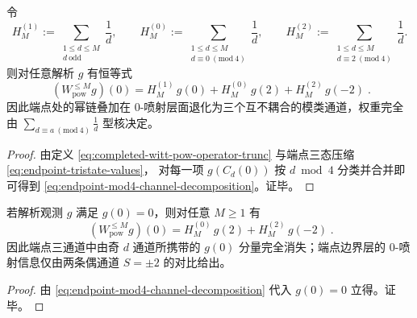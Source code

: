 \begin{proposition}[端点三通道分解：截断幂链在 \texorpdfstring{$S=0$}{S=0} 的模 \texorpdfstring{$4$}{4} 分组恒等式]\label{prop:endpoint-mod4-channel-decomposition}
令
\[
H_M^{(1)}:=\sum_{\substack{1\le d\le M\\ d\ \mathrm{odd}}}\frac1d,\qquad
H_M^{(0)}:=\sum_{\substack{1\le d\le M\\ d\equiv 0\ (\mathrm{mod}\ 4)}}\frac1d,\qquad
H_M^{(2)}:=\sum_{\substack{1\le d\le M\\ d\equiv 2\ (\mathrm{mod}\ 4)}}\frac1d.
\]
则对任意解析 \(g\) 有恒等式
\begin{equation}\label{eq:endpoint-mod4-channel-decomposition}
\boxed{\;
(W_{\mathrm{pow}}^{\le M}g)(0)
=
H_M^{(1)}\,g(0)
+H_M^{(0)}\,g(2)
+H_M^{(2)}\,g(-2)\; }.
\end{equation}
因此端点处的幂链叠加在 \(0\)-喷射层面退化为三个互不耦合的模类通道，权重完全由 \(\sum_{d\equiv a\ (\mathrm{mod}\ 4)}\frac1d\) 型核决定。
\end{proposition}
\begin{proof}
由定义 \eqref{eq:completed-witt-pow-operator-trunc} 与端点三态压缩 \eqref{eq:endpoint-tristate-values}，
对每一项 \(g(C_d(0))\) 按 \(d\bmod 4\) 分类并合并即可得到 \eqref{eq:endpoint-mod4-channel-decomposition}。证毕。
\end{proof}

\begin{corollary}[奇通道的结构性空化（端点 \(0\)-喷射）]\label{cor:endpoint-odd-channel-vanish}
若解析观测 \(g\) 满足 \(g(0)=0\)，则对任意 \(M\ge 1\) 有
\[
\boxed{\;
(W_{\mathrm{pow}}^{\le M}g)(0)=H_M^{(0)}\,g(2)+H_M^{(2)}\,g(-2)\; }.
\]
因此端点三通道中由奇 \(d\) 通道所携带的 \(g(0)\) 分量完全消失；端点边界层的 \(0\)-喷射信息仅由两条偶通道 \(S=\pm 2\) 的对比给出。
\end{corollary}
\begin{proof}
由 \eqref{eq:endpoint-mod4-channel-decomposition} 代入 \(g(0)=0\) 立得。证毕。
\end{proof}

